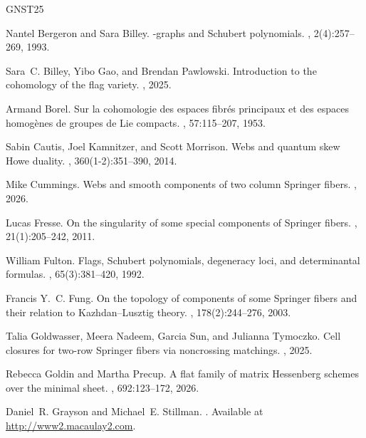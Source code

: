 \documentclass[11pt]{amsart}
\theoremstyle{remark}
\theoremstyle{remark}
\theoremstyle{definition}
\theoremstyle{definition}
\theoremstyle{definition}
\numberwithin{equation}{section}
\begin{document}
\begin{thebibliography}{GNST25}

Nantel Bergeron and Sara Billey.
-graphs and {S}chubert polynomials.
, 2(4):257--269, 1993.

Sara~C. Billey, Yibo Gao, and Brendan Pawlowski.
\newblock Introduction to the cohomology of the flag variety.
, 2025.

Armand Borel.
\newblock Sur la cohomologie des espaces fibr\'es principaux et des espaces homog\`enes de groupes de {L}ie compacts.
, 57:115--207, 1953.

Sabin Cautis, Joel Kamnitzer, and Scott Morrison.
\newblock Webs and quantum skew {H}owe duality.
, 360(1-2):351--390, 2014.

Mike Cummings.
\newblock Webs and smooth components of two column {S}pringer fibers.
, 2026.

Lucas Fresse.
\newblock On the singularity of some special components of {S}pringer fibers.
, 21(1):205--242, 2011.

William Fulton.
\newblock Flags, {S}chubert polynomials, degeneracy loci, and determinantal formulas.
, 65(3):381--420, 1992.

Francis Y.~C. Fung.
\newblock On the topology of components of some {S}pringer fibers and their relation to {K}azhdan–{L}usztig theory.
, 178(2):244--276, 2003.

Talia Goldwasser, Meera Nadeem, Garcia Sun, and Julianna Tymoczko.
\newblock Cell closures for two-row {S}pringer fibers via noncrossing matchings.
, 2025.

Rebecca Goldin and Martha Precup.
\newblock A flat family of matrix {H}essenberg schemes over the minimal sheet.
, 692:123--172, 2026.

Daniel~R. Grayson and Michael~E. Stillman.
.
\newblock Available at \url{http://www2.macaulay2.com}.


\end{thebibliography}
\end{document}
